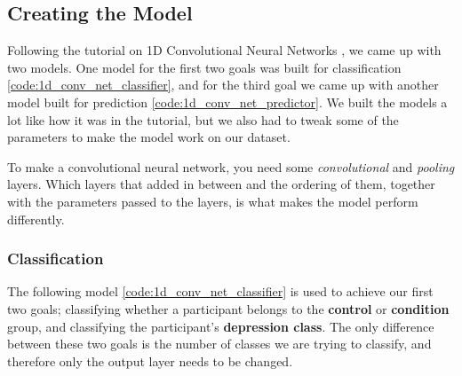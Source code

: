 \subsection{Creating the Model}
Following the tutorial on 1D Convolutional Neural Networks \cite{1d_cnn}, we came up with two models. One model for the first two goals was built for classification \ref{code:1d_conv_net_classifier}, and for the third goal we came up with another model built for prediction \ref{code:1d_conv_net_predictor}. We built the models a lot like how it was in the tutorial, but we also had to tweak some of the parameters to make the model work on our dataset.

To make a convolutional neural network, you need some \textit{convolutional} and \textit{pooling} layers. Which layers that added in between and the ordering of them, together with the parameters passed to the layers, is what makes the model perform differently. 

\subsubsection{Classification}
The following model \ref{code:1d_conv_net_classifier} is used to achieve our first two goals; classifying whether a participant belongs to the \textbf{control} or \textbf{condition} group, and classifying the participant's \textbf{depression class}. The only difference between these two goals is the number of classes we are trying to classify, and therefore only the output layer needs to be changed.

